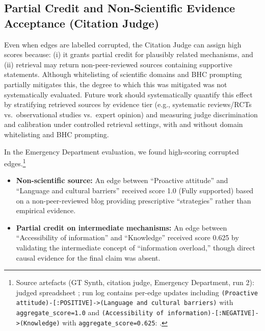 \subsection{Partial Credit and Non-Scientific Evidence Acceptance (Citation Judge)}

Even when edges are labelled corrupted, the Citation Judge can assign high scores because: (i) it grants partial credit for plausibly related mechanisms, and (ii) retrieval may return non-peer-reviewed sources containing supportive statements. Although whitelisting of scientific domains and BHC prompting partially mitigates this, the degree to which this was mitigated was not systematically evaluated. Future work should systematically quantify this effect by stratifying retrieved sources by evidence tier (e.g., systematic reviews/RCTs vs.\ observational studies vs.\ expert opinion) and measuring judge discrimination and calibration under controlled retrieval settings, with and without domain whitelisting and BHC prompting.

In the Emergency Department evaluation, we found high-scoring corrupted edges.\footnote{Source artefacts (GT Synth, citation judge, Emergency Department, run 2): judged spreadsheet ; run log contains per-edge updates including \texttt{(Proactive attitude)-[:POSITIVE]->(Language and cultural barriers)} with \texttt{aggregate\_score=1.0} and \texttt{(Accessibility of information)-[:NEGATIVE]->(Knowledge)} with \texttt{aggregate\_score=0.625}: .}%
\begin{itemize}[noitemsep]
    \item \textbf{Non-scientific source:} An edge between ``Proactive attitude'' and ``Language and cultural barriers'' received score 1.0 (Fully supported) based on a non-peer-reviewed blog providing prescriptive ``strategies'' rather than empirical evidence.
    \item \textbf{Partial credit on intermediate mechanisms:} An edge between ``Accessibility of information'' and ``Knowledge'' received score 0.625 by validating the intermediate concept of ``information overload,'' though direct causal evidence for the final claim was absent.
\end{itemize}

